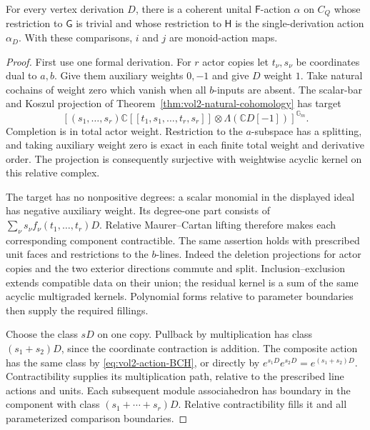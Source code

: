 \begin{lemma}\label{lem:vol2-relative-dual-number-action}
For every vertex derivation $D$, there is a coherent unital
$\mathsf F$-action $\alpha$ on $C_Q$ whose restriction to
$\mathsf G$ is trivial and whose restriction to $\mathsf H$ is
the single-derivation action $\alpha_D$.
With these comparisons, $i$ and $j$ are monoid-action maps.
\end{lemma}
\begin{proof}
First use one formal derivation. For $r$ actor copies let
$t_\nu,s_\nu$ be coordinates dual to $a,b$. Give them auxiliary
weights $0,-1$ and give $D$ weight $1$. Take natural cochains
of weight zero which vanish when all $b$-inputs are absent.
The scalar-bar and Koszul projection of
Theorem~\ref{thm:vol2-natural-cohomology} has target
\begin{equation}\label{eq:vol2-relative-monoid-model}
 \left[(s_1,\ldots,s_r)
 \mathbb C[[t_1,s_1,\ldots,t_r,s_r]]
       \otimes\Lambda(\mathbb C D[-1])\right]^{\mathbb G_m}.
\end{equation}
Completion is in total actor weight. Restriction to the
$a$-subspace has a splitting, and taking auxiliary weight zero
is exact in each finite total weight and derivative order.
The projection is consequently surjective with weightwise
acyclic kernel on this relative complex.

The target has no nonpositive degrees: a scalar monomial in
the displayed ideal has negative auxiliary weight. Its degree-one
part consists of $\sum_\nu s_\nu f_\nu(t_1,\ldots,t_r)D$.
Relative Maurer--Cartan lifting therefore makes each corresponding
component contractible. The same assertion holds with prescribed
unit faces and restrictions to the $b$-lines. Indeed the deletion
projections for actor copies and the two exterior directions
commute and split. Inclusion--exclusion extends compatible data
on their union; the residual kernel is a sum of the same acyclic
multigraded kernels. Polynomial forms relative to parameter
boundaries then supply the required fillings.

Choose the class $sD$ on one copy. Pullback by multiplication
has class $(s_1+s_2)D$, since the coordinate contraction is
addition. The composite action has the same class by
\eqref{eq:vol2-action-BCH}, or directly by
$e^{s_1D}e^{s_2D}=e^{(s_1+s_2)D}$.
Contractibility supplies its multiplication path, relative to
the prescribed line actions and units. Each subsequent module
associahedron has boundary in the component with class
$(s_1+\cdots+s_r)D$. Relative contractibility fills it and all
parameterized comparison boundaries.


\end{proof}

